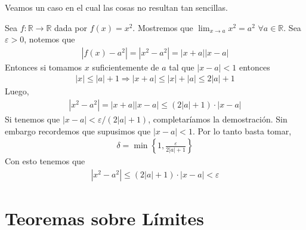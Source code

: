 \documentclass[12pt]{book}
\begin{document}
Veamos un caso en el cual las cosas no resultan tan sencillas.
\begin{eje}{}{}
    Sea $f : \mathbb{R} \to \mathbb{R}$ dada por $f(x)=x^2$. Mostremos que $\displaystyle \lim_{x \to a}x^2=a^2$ $\forall a \in \mathbb{R}$. Sea $\varepsilon>0$, notemos que 
    \begin{align*}
        |f(x)-a^2|=|x^2-a^2|=|x+a||x-a|
    \end{align*}
    Entonces si tomamos $x$ suficientemente de $a$ tal que $|x-a|<1$ entonces
    \begin{align*}
        |x|\leq |a|+1 \Longrightarrow|x+a|\leq |x|+|a| \leq 2|a|+1
    \end{align*}
    Luego,
    \begin{align*}
        |x^2-a^2|=|x+a||x-a|\leq (2|a|+1)\cdot |x-a|
    \end{align*}
    Si tenemos que $|x-a| < \varepsilon/(2|a|+1)$, completaríamos la demostración. Sin embargo recordemos que supusimos que $|x-a|<1$. Por lo tanto basta tomar,
    \begin{align*}
        \delta= \min\left\{1, \frac{\varepsilon}{2|a|+1} \right\}
    \end{align*}
    Con esto tenemos que 
    \begin{align*}
        |x^2-a^2|\leq (2|a|+1)\cdot|x-a|<\varepsilon
    \end{align*}
\end{eje}

\section{Teoremas sobre Límites}
\end{document}
